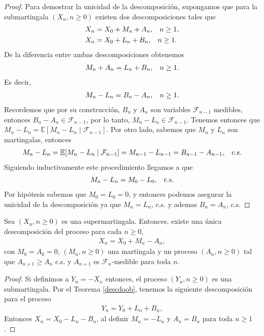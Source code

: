 \begin{proof}
	Para demostrar la unicidad de la descomposición, supongamos que para la submartingala $(X_n, n \geq 0)$ existen dos descomposiciones tales que
	\begin{align*}
		X_n &= X_0 + M_n + A_n, \hspace{0.3cm} n \geq 1, \\
		X_n &= X_0 + L_n + B_n, \hspace{0.3cm} n \geq 1.
	\end{align*}
	De la diferencia entre ambas descomposiciones obtenemos
	\begin{align*}
		M_n + A_n = L_n + B_n, \hspace{0.3cm} n \geq 1.
	\end{align*}
	Es decir, 
	\begin{align*}
		M_n - L_n = B_n - A_n, \hspace{0.3cm} n \geq 1.
	\end{align*}
	Recordemos que por su construcción, $B_n$ y $A_n$ son variables $\mathcal{F}_{n-1}$ medibles, entonces $B_n - A_n \in \mathcal{F}_{n-1}$, por lo tanto, $M_n - L_n \in \mathcal{F}_{n-1}$. Tenemos entonces que $M_n - L_n = \mathbb{E}[M_n - L_n \mid \mathcal{F}_{n-1}]$. Por otro lado, sabemos que $M_n$ y $L_n$ son martingalas, entonces
	\begin{align*}
		M_n - L_n = \mathbb{E}[M_n - L_n \mid \mathcal{F}_{n-1}] = M_{n-1} - L_{n-1} = B_{n-1} - A_{n-1}, \hspace{0.3cm} \text{c.s.}
	\end{align*}
	Siguiendo inductivamente este procedimiento llegamos a que
	\begin{align*}
		M_n - L_n = M_0 - L_0, \hspace{0.3cm} \text{c.s.}
	\end{align*}
	Por hipótesis sabemos que $M_0 = L_0 = 0$, y entonces podemos asegurar la unicidad de la descomposición ya que $M_n = L_n$, c.s. y ademas $B_n = A_n$, c.s.
\end{proof}

\begin{corollary}
	Sea $(X_n, n \geq 0)$ es una supermartingala. Entonces, existe una única descomposición del proceso para cada $n \geq 0$,
	\begin{align*}
		X_n = X_0 + M_n - A_n,
	\end{align*}
	con $M_0 = A_0 = 0$, $(M_n, n \geq 0)$ una martingala y un proceso $(A_n, n \geq 0)$ tal que $A_{n+1} \geq A_n$ c.s. y $A_{n+1}$ es $\mathcal{F}_n$-medible para toda $n$.
\end{corollary}
\begin{proof}
	Si definimos a $Y_n = - X_n$ entonces, el proceso $(Y_n, n \geq 0)$ es una submartingala. Por el Teorema \ref{descdoob}, tenemos la siguiente descomposición para el proceso
	\begin{align*}
		Y_n = Y_0 + L_n + B_n,
	\end{align*}
Entonces $X_n = X_0 - L_n - B_n$, al definir $M_n = - L_n$ y $A_n = B_n$ para toda $n \geq 1$. 
\end{proof}

